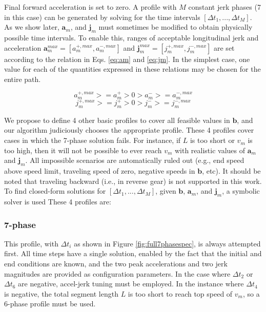 \documentclass[letterpaper, 10 pt, conference]{ieeeconf}  %
\begin{document}
Final forward acceleration is set to zero.
A profile with $M$ constant jerk phases (7 in this case) can be generated by solving for the time intervals $[\Delta t_1, ..., \Delta t_M]$.
As we show later, $\mathbf{a}_m$, and $\mathbf{j}_m$ must sometimes be modified to obtain physically possible time intervals.
To enable this, ranges of acceptable longitudinal jerk and acceleration $\mathbf{a}^{max}_m = [a^{+,max}_m , a^{-,max}_m]$ and $\mathbf{j}^{max}_m = [j^{+,max}_m , j^{-,max}_m]$ are set according to the relation in Eqs. \ref{eq:am} and \ref{eq:jm}.
In the simplest case, one value for each of the quantities expressed in these relations may be chosen for the entire path.

\begin{equation}
  a^{+,max}_m >= a^+_m > 0 > a^-_m >= a^{-,max}_m
  \label{eq:am}
\end{equation}
\begin{equation}
  j^{+,max}_m >= j^+_m > 0 > j^-_m >= j^{-,max}_m
  \label{eq:jm}
\end{equation}

We propose to define 4 other basic profiles to cover all feasible values in $\mathbf{b}$, and our algorithm judiciously chooses the appropriate profile. These 4 profiles cover cases in which the 7-phase solution fails. For instance, if $L$ is too short or $v_m$ is too high, then it will not be possible to ever reach $v_m$ with realistic values of $\mathbf{a}_m$ and $\mathbf{j}_m$.
All impossible scenarios are automatically ruled out (e.g., end speed above speed limit, traveling speed of zero, negative speeds in $\mathbf{b}$, etc).
It should be noted that traveling backward (i.e., in reverse gear) is not supported in this work.
To find closed-form solutions for $[\Delta t_1, ..., \Delta t_M]$, given $\mathbf{b}$, $\mathbf{a}_m$, and $\mathbf{j}_m$, a symbolic solver is used 
These 4 profiles are:

\subsubsection{7-phase} \label{sec:7phase}

This profile, with $\Delta t_i$ as shown in Figure \ref{fig:full7phasespec}, is always attempted first.
All time steps have a single solution, enabled by the fact that the initial and end conditions are known, and the two peak accelerations and two jerk magnitudes are provided as configuration parameters.
In the case where $\Delta t_2$ or $\Delta t_6$ are negative, accel-jerk tuning must be employed.
In the instance where $\Delta t_4$ is negative, the total segment length $L$ is too short to reach top speed of $v_m$, so a 6-phase profile must be used.
\end{document}
